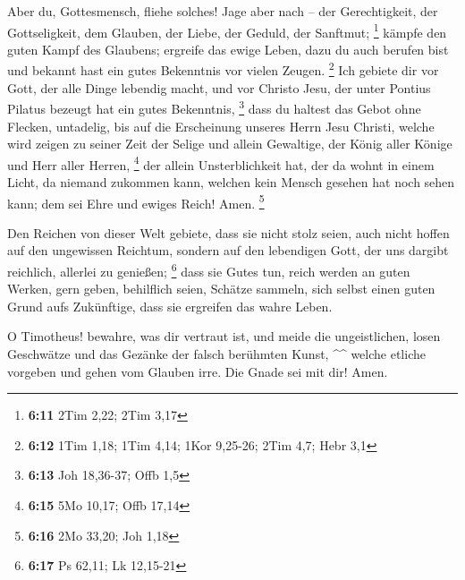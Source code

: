  Aber du, Gottesmensch, fliehe solches! Jage aber nach --
der Gerechtigkeit, der Gottseligkeit, dem Glauben, der Liebe, der
Geduld, der Sanftmut; \footnote{\textbf{6:11} 2Tim 2,22; 2Tim 3,17}
 kämpfe den guten Kampf des Glaubens; ergreife das ewige
Leben, dazu du auch berufen bist und bekannt hast ein gutes Bekenntnis
vor vielen Zeugen. \footnote{\textbf{6:12} 1Tim 1,18; 1Tim 4,14; 1Kor
  9,25-26; 2Tim 4,7; Hebr 3,1}  Ich gebiete dir vor Gott,
der alle Dinge lebendig macht, und vor Christo Jesu, der unter Pontius
Pilatus bezeugt hat ein gutes Bekenntnis, \footnote{\textbf{6:13} Joh
  18,36-37; Offb 1,5}  dass du haltest das Gebot ohne
Flecken, untadelig, bis auf die Erscheinung unseres Herrn Jesu Christi,
 welche wird zeigen zu seiner Zeit der Selige und allein
Gewaltige, der König aller Könige und Herr aller Herren, \footnote{\textbf{6:15}
  5Mo 10,17; Offb 17,14}  der allein Unsterblichkeit hat,
der da wohnt in einem Licht, da niemand zukommen kann, welchen kein
Mensch gesehen hat noch sehen kann; dem sei Ehre und ewiges Reich! Amen.
\footnote{\textbf{6:16} 2Mo 33,20; Joh 1,18}

 Den Reichen von dieser Welt gebiete, dass sie nicht stolz
seien, auch nicht hoffen auf den ungewissen Reichtum, sondern auf den
lebendigen Gott, der uns dargibt reichlich, allerlei zu genießen;
\footnote{\textbf{6:17} Ps 62,11; Lk 12,15-21}  dass sie
Gutes tun, reich werden an guten Werken, gern geben, behilflich seien,
 Schätze sammeln, sich selbst einen guten Grund aufs
Zukünftige, dass sie ergreifen das wahre Leben.

 O Timotheus! bewahre, was dir vertraut ist, und meide die
ungeistlichen, losen Geschwätze und das Gezänke der falsch berühmten
Kunst, \^{}\^{}  welche etliche vorgeben und gehen vom
Glauben irre. Die Gnade sei mit dir! Amen.
